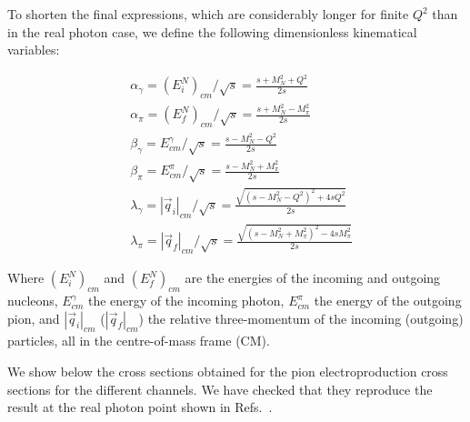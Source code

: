 \documentclass[prc,twocolumn,showpacs,preprintnumbers,amsmath,amssymb
,superscriptaddress,a4paper,nofootinbib
]{revtex4-1}
\begin{document}
To shorten the final expressions, which are considerably longer for finite $Q^2$ than in the real photon case, we define the following dimensionless kinematical variables:

\begin{align}
&\alpha_\gamma= (E_i^{N})_{cm}/\sqrt{s}=\frac{s+M_N^2+Q^2}{2 s}   \\
&\alpha_\pi= (E_f^{N})_{cm}/\sqrt{s} = \frac{s+M_N^2-M_\pi^2}{2 s}  \\              
 & \beta_\gamma = E^{\gamma}_{cm}/\sqrt{s} = \frac{s-M_N^2-Q^2}{2 s}   \\
 & \beta_\pi= E^{\pi}_{cm}/\sqrt{s} = \frac{s-M_N^2+M_\pi^2}{2 s}  \\
 &\lambda_\gamma  = |\vec{q}_i|_{cm}/\sqrt{s}= \frac{\sqrt{(s-M_N^2 - Q^2)^2+4 s Q^2}}{2 s}  \\
&\lambda_\pi =  |\vec{q}_f|_{cm}/\sqrt{s}  = \frac{\sqrt{(s-M_N^2 + M_\pi^2)^2-4 s M_\pi^2}}{2 s}  
\end{align} 

Where $(E_i^{N})_{cm}$  and $(E_f^{N})_{cm}$ are the energies of the incoming and outgoing nucleons, $E^{\gamma}_{cm}$ the energy of the incoming photon, $E^{\pi}_{cm}$ the energy of the outgoing pion, and $|\vec{q}_i|_{cm}$ ($|\vec{q}_f|_{cm}$) the relative three-momentum of the incoming (outgoing) particles, all in the centre-of-mass frame (CM).

We show below the cross sections obtained for the pion electroproduction cross sections for the different channels. 
We have checked that they reproduce the result at the real photon point shown in Refs.~\cite{Lensky:2009uv,Holstein:2005db}.
\end{document}
